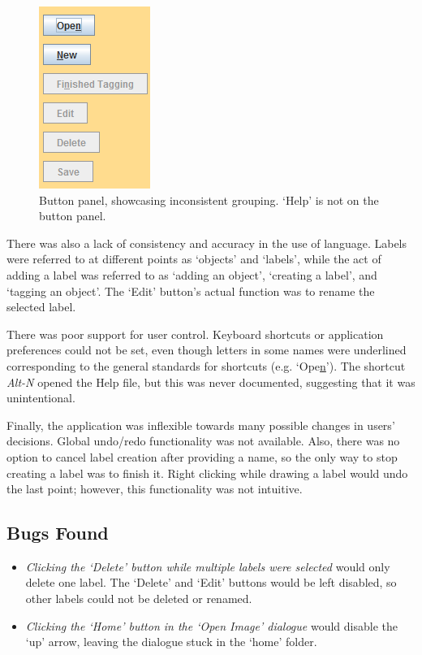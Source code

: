 \documentclass[11pt,twocolumn]{article}
\begin{document}
\begin{figure}[h!]
\centering
\includegraphics[scale=0.8]{buttonpanel.png}
\caption{Button panel, showcasing inconsistent grouping. `Help' is not on the button panel.}
\end{figure}

There was also a lack of consistency and accuracy in the use of language. Labels were referred to at different points as `objects' and `labels', while the act of adding a label was referred to as `adding an object', `creating a label', and `tagging an object'. The `Edit' button's actual function was to rename the selected label.

There was poor support for user control. Keyboard shortcuts or application preferences could not be set, even though letters in some names were underlined corresponding to the general standards for shortcuts (e.g. `Ope\underline{n}'). The shortcut \emph{Alt-N} opened the Help file, but this was never documented, suggesting that it was unintentional.

Finally, the application was inflexible towards many possible changes in users' decisions. Global undo/redo functionality was not available. Also, there was no option to cancel label creation after providing a name, so the only way to stop creating a label was to finish it. Right clicking while drawing a label would undo the last point; however, this functionality was not intuitive. 

\subsection{Bugs Found}

\begin{itemize}
\item \emph{Clicking the `Delete' button while multiple labels were selected} would only delete one label. The `Delete' and `Edit' buttons would be left disabled, so other labels could not be deleted or renamed.
\item \emph{Clicking the `Home' button in the `Open Image' dialogue} would disable the `up' arrow, leaving the dialogue stuck in the `home' folder.
\end{itemize}
\end{document}
